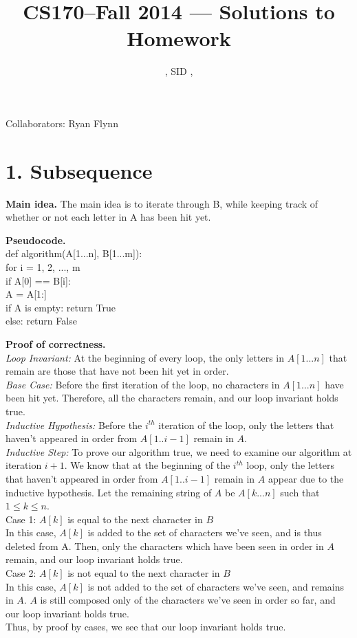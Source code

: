 \documentclass[11pt]{article}
\title{CS170--Fall 2014 --- Solutions to Homework \Homework}
\author{\Name, SID \SID, \texttt{\Login}}
\begin{document}
\maketitle

\noindent
Collaborators: Ryan Flynn


\section*{1. Subsequence}
\noindent
\textbf{Main idea.}
The main idea is to iterate through B, while keeping track of whether or not each letter in A has been hit yet.  


\noindent
\textbf{Pseudocode.}\\
def algorithm(A[1...n], B[1...m]): \\
\indent for i = 1, 2, ..., m \\
\indent\indent if A[0] == B[i]: \\
\indent\indent\indent A = A[1:] \\
\indent if A is empty: return True \\
\indent else: return False

\noindent
\textbf{Proof of correctness.} \\
\textit{Loop Invariant:} At the beginning of every loop, the only letters in $A[1...n]$ that remain are those that have not been hit yet in order. \\
\textit{Base Case:} Before the first iteration of the loop, no characters in $A[1...n]$ have been hit yet.  Therefore, all the characters remain, and our loop invariant holds true. \\
\textit{Inductive Hypothesis:} Before the $i^{th}$ iteration of the loop, only the letters that haven't appeared in order from $A[1..i-1]$ remain in $A$. \\
\textit{Inductive Step:} To prove our algorithm true, we need to examine our algorithm at iteration $i + 1$.  We know that at the beginning of the $i^{th}$ loop, only the letters that haven't appeared in order from $A[1..i-1]$ remain in $A$ appear due to the inductive hypothesis.  Let the remaining string of $A$ be $A[k...n]$ such that $1 \leq k \leq n$.  \\
Case 1: $A[k]$ is equal to the next character in $B$\\
\indent In this case, $A[k]$ is added to the set of characters we've seen, and is thus deleted from A.  Then, only the characters which have been seen in order in $A$ remain, and our loop invariant holds true. \\
Case 2: $A[k]$ is not equal to the next character in $B$\\
\indent In this case, $A[k]$ is not added to the set of characters we've seen, and remains in $A$.  $A$ is still composed only of the characters we've seen in order so far, and our loop invariant holds true.\\
Thus, by proof by cases, we see that our loop invariant holds true.
\end{document}
